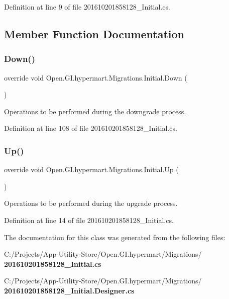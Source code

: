 Definition at line 9 of file 201610201858128\+\_\+\+Initial.\+cs.



\subsection{Member Function Documentation}
\mbox{\label{class_open_1_1_g_i_1_1hypermart_1_1_migrations_1_1_initial_a30a9317e9693d9c0431a1bda53d4497b}} 
\subsubsection{Down()}
{\footnotesize\ttfamily override void Open.\+G\+I.\+hypermart.\+Migrations.\+Initial.\+Down (\begin{DoxyParamCaption}{ }\end{DoxyParamCaption})}



Operations to be performed during the downgrade process. 



Definition at line 108 of file 201610201858128\+\_\+\+Initial.\+cs.

\mbox{\label{class_open_1_1_g_i_1_1hypermart_1_1_migrations_1_1_initial_a0d322b6e395871e51474b0a1accfa014}} 
\subsubsection{Up()}
{\footnotesize\ttfamily override void Open.\+G\+I.\+hypermart.\+Migrations.\+Initial.\+Up (\begin{DoxyParamCaption}{ }\end{DoxyParamCaption})}



Operations to be performed during the upgrade process. 



Definition at line 14 of file 201610201858128\+\_\+\+Initial.\+cs.



The documentation for this class was generated from the following files\+:\begin{DoxyCompactItemize}
\item 
C\+:/\+Projects/\+App-\/\+Utility-\/\+Store/\+Open.\+G\+I.\+hypermart/\+Migrations/\textbf{ 201610201858128\+\_\+\+Initial.\+cs}\item 
C\+:/\+Projects/\+App-\/\+Utility-\/\+Store/\+Open.\+G\+I.\+hypermart/\+Migrations/\textbf{ 201610201858128\+\_\+\+Initial.\+Designer.\+cs}\end{DoxyCompactItemize}
